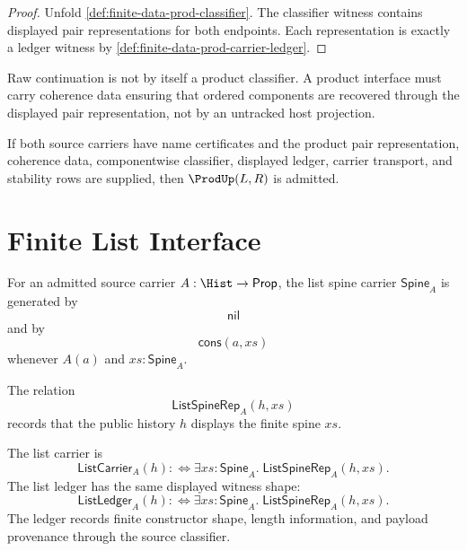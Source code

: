 \begin{proof}
Unfold \autoref{def:finite-data-prod-classifier}.  The classifier witness
contains displayed pair representations for both endpoints.  Each
representation is exactly a ledger witness by
\autoref{def:finite-data-prod-carrier-ledger}.
\end{proof}

\begin{principle}
\label{prin:finite-data-prod-coherence}
Raw continuation is not by itself a product classifier.  A product interface
must carry coherence data ensuring that ordered components are recovered
through the displayed pair representation, not by an untracked host
projection.
\end{principle}

\begin{corollary}
\label{cor:finite-data-prod-admission}
If both source carriers have name certificates and the product pair
representation, coherence data, componentwise classifier, displayed ledger,
carrier transport, and stability rows are supplied, then $\ProdUp(L,R)$ is
admitted.
\end{corollary}

\section{Finite List Interface}
\label{sec:finite-data-list-interface}

\begin{definition}
\label{def:finite-data-list-spine}
For an admitted source carrier $A:\Hist\to\mathsf{Prop}$, the list spine
carrier $\mathsf{Spine}_A$ is generated by
$$
\mathsf{nil}
$$
and by
$$
\mathsf{cons}(a,xs)
$$
whenever $A(a)$ and $xs:\mathsf{Spine}_A$.
\end{definition}

\begin{definition}
\label{def:finite-data-list-spine-rep}
The relation
$$
\mathsf{ListSpineRep}_A(h,xs)
$$
records that the public history $h$ displays the finite spine $xs$.
\end{definition}

\begin{definition}
\label{def:finite-data-list-carrier-ledger}
The list carrier is
$$
\mathsf{ListCarrier}_A(h)
:\Longleftrightarrow
\exists xs:\mathsf{Spine}_A.\;\mathsf{ListSpineRep}_A(h,xs).
$$
The list ledger has the same displayed witness shape:
$$
\mathsf{ListLedger}_A(h)
:\Longleftrightarrow
\exists xs:\mathsf{Spine}_A.\;\mathsf{ListSpineRep}_A(h,xs).
$$
The ledger records finite constructor shape, length information, and payload
provenance through the source classifier.
\end{definition}

